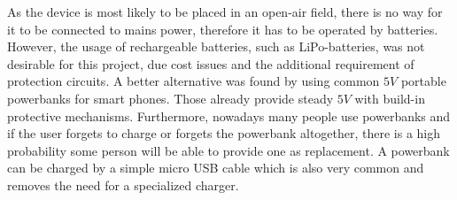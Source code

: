 \noindent As the device is most likely to be placed in an open-air field, there is no way for it to be connected to mains power, therefore it has to be operated by batteries. However, the usage of rechargeable batteries, such as LiPo-batteries, was not desirable for this project, due cost issues and the additional requirement of protection circuits. A better alternative was found by using common $5V$ portable powerbanks for smart phones. Those already provide steady $5V$ with build-in protective mechanisms. Furthermore, nowadays many people use powerbanks and if the user forgets to charge or forgets the powerbank altogether, there is a high probability some person will be able to provide one as replacement. A powerbank can be charged by a simple micro USB cable which is also very common and removes the need for a specialized charger.


\pagebreak